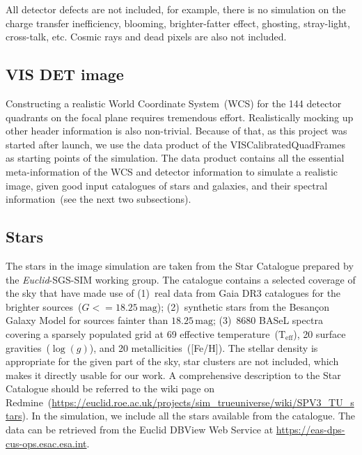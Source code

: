 \documentclass[11pt]{EuclidVIS}
\numberwithin{table}{section}
\numberwithin{figure}{section}
\begin{document}
All detector defects are not included, for example, there is no simulation on the charge transfer 
inefficiency, blooming, brighter-fatter effect, ghosting, stray-light, cross-talk, etc. Cosmic
rays and dead pixels are also not included.

\subsection{VIS DET image}
Constructing a realistic World Coordinate System~(WCS) for the 144 detector quadrants on the
focal plane requires tremendous effort. Realistically mocking up other header information is also
non-trivial. Because of that, as this project was started after launch, we use the data product of
the VISCalibratedQuadFrames as starting points of the simulation. The data product contains all the 
essential meta-information of the WCS and detector information to simulate a realistic image, given 
good input catalogues of stars and galaxies, and their spectral information~(see the next two 
subsections).

\subsection{Stars}
The stars in the image simulation are taken from the Star Catalogue prepared by the
\textit{Euclid}-SGS-SIM working group. The catalogue contains a selected coverage of the sky that
have made use of (1)~real data from Gaia DR3 catalogues for the brighter sources~($G <=
18.25\,\mathrm{mag}$); (2)~synthetic stars from the Besan\c{c}on Galaxy Model for sources fainter
than  $18.25\,\mathrm{mag}$; (3)~8680 BASeL spectra covering a sparsely populated grid at 69 
effective temperature~($\mathrm{T}_{\mathrm{eff}}$), 20 surface gravities~($\log(g)$), and 20
metallicities~([Fe/H]). The stellar density is appropriate for the given part of the sky, star 
clusters are not included, which makes it directly usable for our work. A comprehensive description
to the Star Catalogue should be referred to the wiki page on
Redmine~(\url{https://euclid.roe.ac.uk/projects/sim_trueuniverse/wiki/SPV3_TU_stars}). 
In the simulation, we include all the stars available from the catalogue. The data can be retrieved
from the Euclid DBView Web Service at \url{https://eas-dps-cus-ops.esac.esa.int}.
\end{document}
